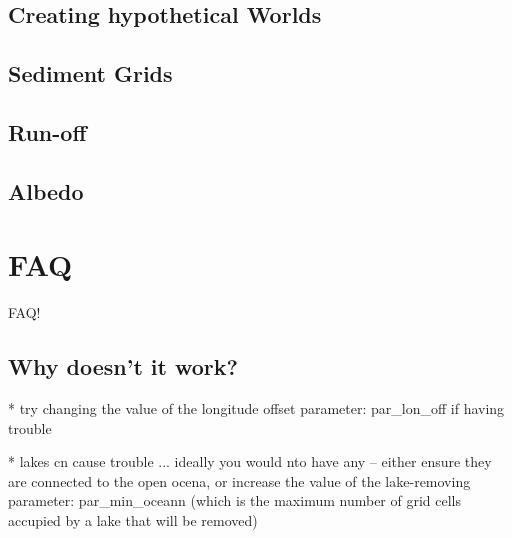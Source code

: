 \documentclass[11pt,fleqn]{book} %
\begin{document}
\section{Creating hypothetical Worlds}


\section{Sediment Grids}


\section{Run-off}


\section{Albedo}






\chapter{FAQ}

FAQ!


\section{Why doesn't it work?}



* try changing the value of the longitude offset parameter:
  par\_lon\_off
  if having trouble

* lakes cn cause trouble ... ideally you would nto have any -- either ensure they are connected to the open ocena,
    or increase the value of the lake-removing parameter:
    par\_min\_oceann
    (which is the maximum number of grid cells accupied by a lake that will be removed)
    
\end{document}
